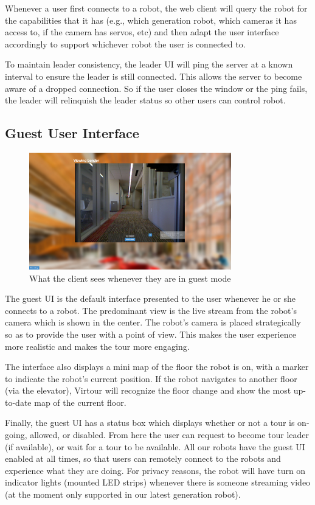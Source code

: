 \documentclass[
  oneside,
  11pt, a4paper,
  footinclude=true,
  headinclude=true,
  cleardoublepage=empty
]{article}
\begin{document}
Whenever a user first connects to a robot, the web client will query the robot
for the capabilities that it has (e.g., which generation robot, which cameras it
has access to, if the camera has servos, etc) and then adapt the user
interface accordingly to support whichever robot the user is connected to.

To maintain leader consistency, the leader UI will ping the server at
a known interval to ensure the leader is still connected. This allows the
server to become aware of a dropped connection. So if the user closes the window
or the ping fails, the leader will relinquish the leader status so other users
can control robot.


\subsection{Guest User Interface}

\begin{figure}
  \centering
  \includegraphics[height=2in]{guestUI}
  \caption{What the client sees whenever they are in guest mode}
  \label{fig:guest_mode}
\end{figure}

The guest UI is the default interface presented to the user whenever he or she
connects to a robot. The predominant view is the live stream from the robot's
camera which is shown in the center. The robot's camera is placed strategically
so as to provide the user with a point of view. This makes the user experience
more realistic and makes the tour more engaging.

The interface also displays a mini map of the floor the robot is
on, with a marker to indicate the robot's current position.  If the
robot navigates to another floor (via the elevator), Virtour will recognize the
floor change and show the most up-to-date map of the current floor.

Finally, the guest UI has a status box which displays whether or not a tour is
on-going, allowed, or disabled. From here the user can request to become tour
leader (if available), or wait for a tour to be available. All our robots have
the guest UI enabled at all times, so that users can remotely connect to the
robots and experience what they are doing. For privacy reasons, the robot will
have turn on indicator lights (mounted LED strips) whenever there is someone
streaming video (at the moment only supported in our latest generation robot).
\end{document}
